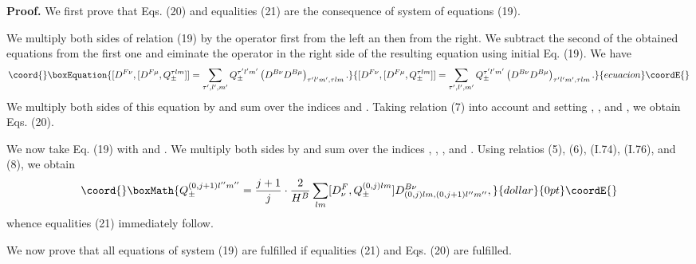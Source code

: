 \documentclass[a4paper,12pt]{article}
\begin{document}
{\bf Proof.} We first prove that Eqs. (20) and equalities (21) are the
consequence of system of equations (19). 

We multiply both sides of relation (19) by the operator \coordHE{} first from
the left an then from the right. We subtract the second of the obtained
equations from the first one and eiminate the operator \coordHE{} in the right
side of the resulting equation using initial Eq. (19). We have
\begin{equation}\coord{}\boxEquation{
[D^{F \nu},[D^{F \mu},Q^{\tau lm}_{\pm}]] =
\sum_{\tau',l',m'} Q^{\tau' l'm'}_{\pm} 
\left( D^{B \nu}D^{B \mu} \right)_{\tau' l'm', \tau lm}.
}{
[D^{F \nu},[D^{F \mu},Q^{\tau lm}_{\pm}]] =
\sum_{\tau',l',m'} Q^{\tau' l'm'}_{\pm} 
\left( D^{B \nu}D^{B \mu} \right)_{\tau' l'm', \tau lm}.
}{ecuacion}\coordE{}\end{equation}
We multiply both sides of this equation by \coordHE{} and sum over the
indices \myHighlight{$\mu$}\coordHE{} and \myHighlight{$\nu$}\coordHE{}. Taking relation (7) into account and setting
\coordHE{}, \coordHE{}, and \coordHE{}, we obtain Eqs. (20).

We now take Eq. (19) with \coordHE{} and \coordHE{}. We multiply both sides
by \coordHE{} and sum over the indices 
\myHighlight{$\mu$}\coordHE{}, \myHighlight{$\nu$}\coordHE{}, \coordHE{}, and \coordHE{}. Using relatios (5), (6), (I.74), (I.76), and (8),
we obtain
$$\coord{}\boxMath{Q^{(0,j+1)l''m''}_{\pm} =\frac{j+1}{j}\cdot\frac{2}{H^{B}}
\sum_{lm} [D^{F}_{\nu},Q^{(0,j)lm}_{\pm}] D^{B \nu}_{(0,j)lm, (0,j+1)l''m''},}{dollar}{0pt}\coordE{}$$
whence equalities (21) immediately follow.

We now prove that all equations of system (19) are fulfilled if equalities
(21) and Eqs. (20) are fulfilled. 
\end{document}
